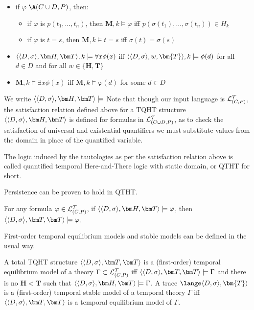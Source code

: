 \begin{itemize}
  \item if $\varphi$ \in $\A(C \cup D,P)$, then:
    \begin{itemize}
    \item if $\varphi$ is $p(t_1,\dots,t_n)$, then $\bm{M},k \models \varphi$ iff $p(\sigma(t_1), \dots, \sigma(t_n))\in H_k$
    \item if $\varphi$ is $t = s$, then  $\bm{M},k \models t = s$ iff $\sigma(t) = \sigma(s)$
    \end{itemize}
  \item $\qthandt,k \models \forall x \phi(x)$ iff $\langle \dsigma, w,\bm{T} \rangle,k \models \phi(d)$ for all $d \in D$ and for all $w \in \{\bm{H}, \bm{T}\}$ 
  \item $\bm{M},k \models \exists x \phi(x)$ iff $\bm{M},k \models \varphi(d)$ for some $d \in D$
  \end{itemize}
  We write $\qthandt \models$
Note that though our input language is $\mathcal{L}_{(C,P)}^\mathcal{T}$, the satisfaction
relation defined above for a TQHT structure $\qthandt$ is defined for
formulas in $\mathcal{L}_{(C \cup D,P)}^\mathcal{T}$, as to check the satisfaction of universal and
existential quantifiers we must substitute values from the domain in
place of the quantified variable.

The logic induced by the tautologies as per the satisfaction relation
above is called quantified temporal Here-and-There logic with static
domain, or QTHT for short.

Persistence can be proven to hold in QTHT.

\begin{proposition}
  For any formula $\varphi \in \mathcal{L}_{(C,P)}^\mathcal{T}$, if $\qthandt \models \varphi$, then
  $\qttandt \models \varphi$.
\end{proposition}

First-order temporal equilibrium models and stable models can be defined in the usual way.

\begin{definition}
  A total TQHT structure $\qttandt$ is a (first-order) temporal
  equilibrium model of a theory $\Gamma \subset \mathcal{L}_{(C,P)}^\mathcal{T}$ iff
  $\qttandt \models \Gamma$ and there is no $\bm{H} < \bm{T}$ such
  that $\qthandt \models \Gamma$. A trace
  $\lange \dsigma, \bm{T} \rangle$ is a (first-order) temporal stable
  model of a temporal theory $\Gamma$ iff $\qttandt$ is a temporal
  equilibrium model of $\Gamma$.
\end{definition}

